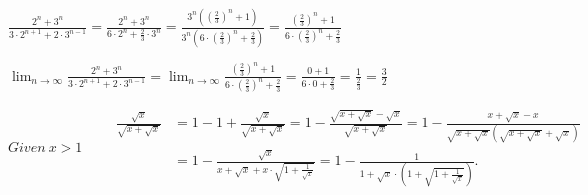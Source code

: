 $\frac{2^n+3^n}{3 \cdot 2^{n+1}+2 \cdot 3^{n-1}}=\frac{2^n+3^n}{6 \cdot 2^n+\frac{2}{3} \cdot 3^n}=\frac{3^n\left(\left(\frac{2}{3}\right)^n+1\right)}{3^n\left(6 \cdot\left(\frac{2}{3}\right)^n+\frac{2}{3}\right)}=\frac{\left(\frac{2}{3}\right)^n+1}{6 \cdot\left(\frac{2}{3}\right)^n+\frac{2}{3}}$

$\lim _{n \rightarrow \infty} \frac{2^n+3^n}{3 \cdot 2^{n+1}+2 \cdot 3^{n-1}}=\lim _{n \rightarrow \infty} \frac{\left(\frac{2}{3}\right)^n+1}{6 \cdot\left(\frac{2}{3}\right)^n+\frac{2}{3}}=\frac{0+1}{6 \cdot 0+\frac{2}{3}}=\frac{1}{\frac{2}{3}}=\frac{3}{2}$

$Given\ x>1\qquad
\begin{aligned} \frac{\sqrt{x}}{\sqrt{x+\sqrt{x}}} & =1-1+\frac{\sqrt{x}}{\sqrt{x+\sqrt{x}}}=1-\frac{\sqrt{x+\sqrt{x}}-\sqrt{x}}{\sqrt{x+\sqrt{x}}}=1-\frac{x+\sqrt{x}-x}{\sqrt{x+\sqrt{x}}(\sqrt{x+\sqrt{x}}+\sqrt{x})} \\ & =1-\frac{\sqrt{x}}{x+\sqrt{x}+x \cdot \sqrt{1+\frac{1}{\sqrt{x}}}}=1-\frac{1}{1+\sqrt{x} \cdot\left(1+\sqrt{1+\frac{1}{\sqrt{x}}}\right)} .\end{aligned}$

